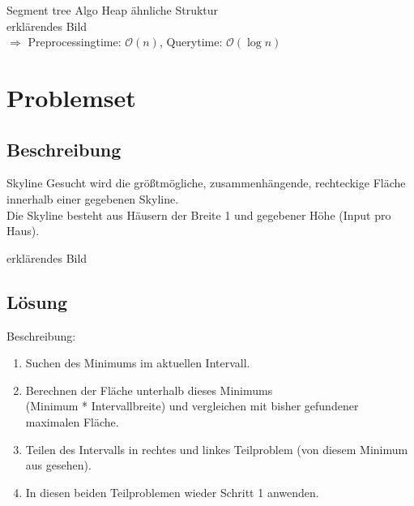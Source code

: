 \documentclass[11pt]{beamer}
\newcommand*{\Oh}{\mathcal{O}}
\begin{document}
\begin{frame}
\begin{block}{Segment tree Algo}
Heap ähnliche Struktur \\
erklärendes Bild \\
$\Rightarrow$ Preprocessingtime: $\Oh(n)$, Querytime: $\Oh(\log n)$
\end{block}
\end{frame}

\section{Problemset}
\frame{\sectionpage}

\subsection{Beschreibung}

\begin{frame}
\begin{block}{Skyline}
Gesucht wird die größtmögliche, zusammenhängende, rechteckige Fläche innerhalb einer gegebenen Skyline.\\
Die Skyline besteht aus Häusern der Breite 1 und gegebener Höhe (Input pro Haus).
\end{block}

erklärendes Bild \\[5mm]
\end{frame}

\subsection{Lösung}
\begin{frame}
Beschreibung:\\
\begin{enumerate}
\item Suchen des Minimums im aktuellen Intervall.
\item Berechnen der Fläche unterhalb dieses Minimums\\ (Minimum * Intervallbreite) und vergleichen mit bisher gefundener maximalen Fläche.
\item Teilen des Intervalls in rechtes und linkes Teilproblem (von diesem Minimum aus gesehen).
\item In diesen beiden Teilproblemen wieder Schritt 1 anwenden.
\end{enumerate}
\end{frame}
\end{document}
